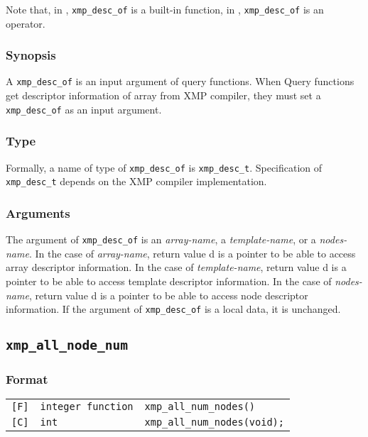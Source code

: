              Note that, in {\XMPF}, {\tt xmp\_desc\_of} is a built-in function,
             in {\XMPC}, {\tt xmp\_desc\_of} is an operator.

\subsubsection*{Synopsis}

    A {\tt xmp\_desc\_of} is an input argument of query functions.
    When Query functions get descriptor information of array
    from XMP compiler, they must set a {\tt xmp\_desc\_of} as an
    input argument.

\subsubsection*{Type}

    Formally, a name of type of {\tt xmp\_desc\_of} is {\tt xmp\_desc\_t}.
    Specification of {\tt xmp\_desc\_t} depends on the XMP compiler implementation.

\subsubsection*{Arguments}

   The argument of {\tt xmp\_desc\_of} is an {\it array-name}, a {\it template-name}, or a {\it nodes-name}.
   In the case of {\it array-name}, return value d is a pointer to
   be able to access array descriptor information.
   In the case of {\it template-name}, return value d is a pointer to
   be able to access template descriptor information.
   In the case of {\it nodes-name}, return value d is a pointer to
   be able to access node descriptor information.
   If the argument of {\tt xmp\_desc\_of} is a local data, it is unchanged.

\vspace{0.3cm}

\subsection{\tt xmp\_all\_node\_num}

\subsubsection*{Format}

\begin{tabular}{lll}

\verb![F]!&  {\tt integer function}& {\tt xmp\_all\_num\_nodes()}\\

\verb![C]!&  {\tt int}& {\tt xmp\_all\_num\_nodes(void);}

\end{tabular}

